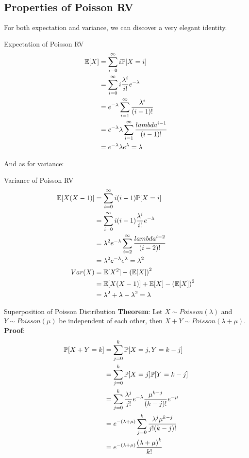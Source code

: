\subsection{Properties of Poisson RV}
For both expectation and variance, we can discover a very elegant identity. \\
\begin{ln-theorem}{Expectation of Poisson RV}{}
    \begin{align*}
        \E[X]
        &= \sum_{i = 0}^\infty i \P[X = i] \\
        &= \sum_{i = 0}^\infty i \frac{\lambda^i}{i!} e^{-\lambda} \\
        &= e^{-\lambda} \sum_{i = 1}^\infty \frac{\lambda^i}{(i - 1)!} \\
        &= e^{-\lambda} \lambda \sum_{i = 1}^\infty \frac{lambda^{i - 1}}{(i - 1)!} \\
        &= e^{-\lambda} \lambda e^{\lambda} = \lambda
    \end{align*}
\end{ln-theorem}
And as for variance:
\begin{ln-theorem}{Variance of Poisson RV}{}
    \begin{align*}
        \E[X(X - 1)]
        &= \sum_{i = 0}^\infty i(i - 1) \P[X = i] \\
        &= \sum_{i = 0}^\infty i(i - 1) \frac{\lambda^i}{i!} e^{-\lambda} \\
        &= \lambda^2 e^{-\lambda} \sum_{i = 2}^\infty \frac{lambda^{i - 2}}{(i - 2)!} \\
        &= \lambda^2 e^{-\lambda} e^{\lambda} = \lambda^2 \\
        Var(X) &= \E[X^2] - {(\E[X])}^2 \\
        &= \E[X(X - 1)] + \E[X] - {(\E[X])}^2 \\
        &= \lambda^2 + \lambda - \lambda^2 = \lambda
    \end{align*}
\end{ln-theorem}

\begin{ln-theorem}{Superposition of Poisson Distribution}{}
    \textbf{Theorem}: Let $X \sim Poisson(\lambda)$ and $Y \sim Poisson(\mu)$ \underline{be independent of each other}, then $X + Y \sim Poisson(\lambda + \mu)$.
    \tcblower
    \textbf{Proof}:
    \begin{align*}
        \P[X + Y = k]
        &= \sum_{j = 0}^k \P[X = j, Y = k - j] \\
        &= \sum_{j = 0}^k \P[X = j] \P[Y = k - j] \\
        &= \sum_{j = 0}^k \frac{\lambda^j}{j!} e^{-\lambda} \frac{\mu^{k - j}}{(k - j)!} e^{-\mu} \\
        &= e^{-(\lambda + \mu)} \sum_{j = 0}^k \frac{\lambda^j \mu^{k - j}}{j!(k - j)!} \\
        &= e^{-(\lambda + \mu)} \frac{{(\lambda + \mu)}^k}{k!}
    \end{align*}
\end{ln-theorem}

